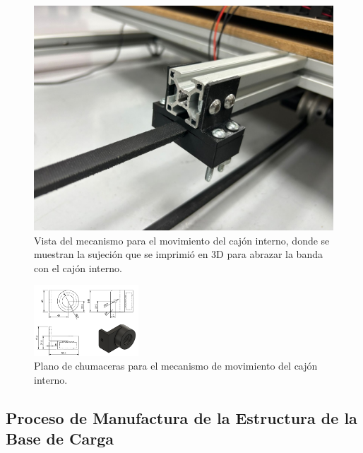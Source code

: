 \begin{figure}[h]
\begin{minipage}{0.49\textwidth}
        \label{fig:imagen2}
    \end{minipage}%
    \hfill
    \begin{minipage}{0.49\textwidth}
        \centering
        \includegraphics[width=\textwidth]{MECANISMO/MECANISMO_AGARRE.jpg}
        \caption{Vista del mecanismo para el movimiento del cajón interno, donde se muestran la sujeción que se imprimió en 3D para abrazar la banda con el cajón interno.}
        \label{fig:imagen1}
    \end{minipage}%
    \hfill
\end{figure}

\begin{figure}[htpb]
    \centering
    \includegraphics[width=0.35\textwidth]{PLANOS/PLANO_CHUMACERA.png}
    \caption{Plano de chumaceras para el mecanismo de movimiento del cajón interno.}
    \label{fig:etiqueta}
\end{figure}


\subsection{Proceso de Manufactura de la Estructura de la Base de Carga}

